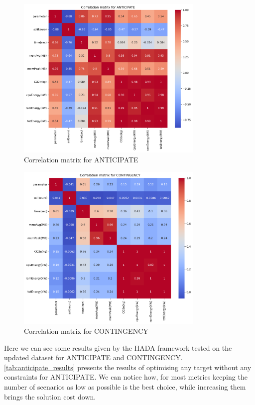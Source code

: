 \documentclass[a4paper,singleside,12pt]{report} %
\begin{document}

\begin{figure}[h!]
    \centering
    \includegraphics[width=0.8\textwidth]{imgs/ant_corr_mat.png}
    \caption{Correlation matrix for ANTICIPATE}
    \label{fig:ant_corr_mat}
\end{figure}

\begin{figure}[h!]
    \centering
    \includegraphics[width=0.8\textwidth]{imgs/cont_corr_mat.png}
    \caption{Correlation matrix for CONTINGENCY}
    \label{fig:cont_corr_mat}
\end{figure}

Here we can see some results given by the HADA framework tested on the updated dataset for ANTICIPATE and CONTINGENCY. \ref{tab:anticipate_results}
presents the results of optimising any target without any constraints for ANTICIPATE. We can notice how, for most metrics keeping the number of scenarios
as low as possible is the best choice, while increasing them brings the solution cost down.
\end{document}
